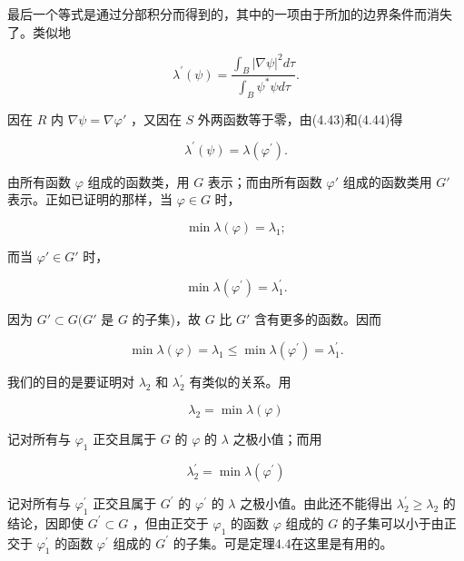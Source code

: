 最后一个等式是通过分部积分而得到的，其中的一项由于所加的边界条件而消失了。类似地

\begin{equation*}
\lambda^ {\prime} (\psi) = \frac {\int_ {B} | \nabla \psi | ^ {2} d \tau}{\int_ {B} \psi^ {*} \psi d \tau}.\tag{4.44}
\end{equation*}

因在 $R$ 内 $\nabla \psi = \nabla \varphi'$ ，又因在 $S$ 外两函数等于零，由(4.43)和(4.44)得

\begin{equation*}
\lambda^ {\prime} (\psi) = \lambda \left(\varphi^ {\prime}\right).\tag{4.45}
\end{equation*}

由所有函数 $\varphi$ 组成的函数类，用 $G$ 表示；而由所有函数 $\varphi'$ 组成的函数类用 $G'$ 表示。正如已证明的那样，当 $\varphi \in G$ 时，

\begin{equation*}
\min \lambda (\varphi) = \lambda_ {1};
\end{equation*}

而当 $\varphi' \in G'$ 时，

\begin{equation*}
\min \lambda (\varphi ^ {\prime}) = \lambda_ {1} ^ {\prime}.
\end{equation*}

因为 $G' \subset G(G'$ 是 $G$ 的子集)，故 $G$ 比 $G'$ 含有更多的函数。因而

\begin{equation*}
\min \lambda (\varphi) = \lambda_ {1} \leqslant \min \lambda \left(\varphi^ {\prime}\right) = \lambda_ {1} ^ {\prime}.\tag{4.46}
\end{equation*}

我们的目的是要证明对 $\lambda_{2}$ 和 $\lambda_{2}^{\prime}$ 有类似的关系。用

\begin{equation*}
\lambda_ {2} = \min \lambda (\varphi)
\end{equation*}

记对所有与 $\varphi_{1}$ 正交且属于 $G$ 的 $\varphi$ 的 $\lambda$ 之极小值；而用

\begin{equation*}
\lambda_ {2} ^ {\prime} = \min \lambda (\varphi^ {\prime})
\end{equation*}

记对所有与 $\varphi_{1}^{\prime}$ 正交且属于 $G^{\prime}$ 的 $\varphi^{\prime}$ 的 $\lambda$ 之极小值。由此还不能得出 $\lambda_{2}^{\prime} \geqslant \lambda_{2}$ 的结论，因即使 $G^{\prime} \subset G$ ，但由正交于 $\varphi_{1}$ 的函数 $\varphi$ 组成的 $G$ 的子集可以小于由正交于 $\varphi_{1}^{\prime}$ 的函数 $\varphi^{\prime}$ 组成的 $G^{\prime}$ 的子集。可是定理4.4在这里是有用的。

